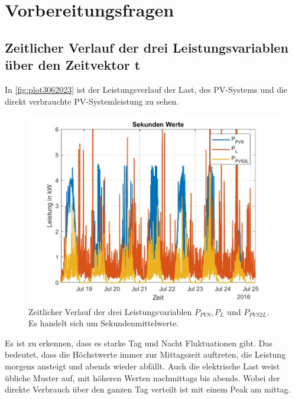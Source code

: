 \newpage
\section{Vorbereitungsfragen}
\subsection{Zeitlicher Verlauf der
drei Leistungsvariablen über den Zeitvektor t}
In \autoref{fig:plot3062023} ist der Leistungsverlauf der Last, des PV-Systems und die direkt verbrauchte PV-Systemleistung zu sehen.
\begin{figure}[H]
    \centering
    \includegraphics[width=\textwidth]{Abbildungen/plot.jpg}
    \caption{Zeitlicher Verlauf der drei Leistungsvariablen $P_{PVS}, P_{L}$ und $P_{PVS2L}$. Es handelt sich um Sekundenmittelwerte.}
    \label{fig:plot3062023}
\end{figure}
Es ist zu erkennen, dass es starke Tag und Nacht Fluktuationen gibt. 
Das bedeutet, dass die Höchstwerte immer zur Mittagszeit auftreten, die Leistung morgens ansteigt und abends wieder abfällt. Auch die elektrische Last weist übliche Muster auf, mit höheren Werten nachmittags bis abends. 
Wobei der direkte Verbrauch über den ganzen Tag verteilt ist mit einem Peak am mittag.

